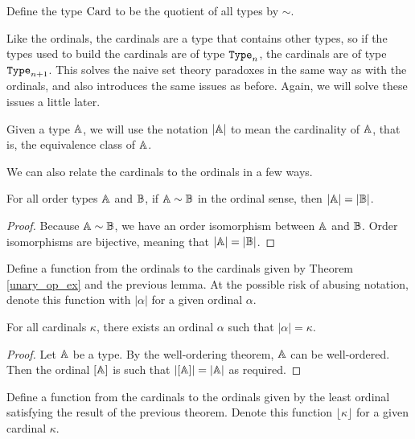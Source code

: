\documentclass[../../math.tex]{subfiles}
\begin{document}
\begin{definition}
    Define the type $\operatorname{Card}$ to be the quotient of all types by $\sim$.
\end{definition}

Like the ordinals, the cardinals are a type that contains other types, so if the
types used to build the cardinals are of type $\Type_n$, the cardinals are of
type $\Type_{n+1}$.  This solves the naive set theory paradoxes in the same way
as with the ordinals, and also introduces the same issues as before.  Again, we
will solve these issues a little later.

\begin{definition}
    Given a type $\mathbb{A}$, we will use the notation $|\mathbb{A}|$ to mean the cardinality
    of $\mathbb{A}$, that is, the equivalence class of $\mathbb{A}$.
\end{definition}

We can also relate the cardinals to the ordinals in a few ways.

\begin{lemma}
    For all order types $\mathbb{A}$ and $\mathbb{B}$, if $\mathbb{A} \sim \mathbb{B}$ in the ordinal sense,
    then $|\mathbb{A}| = |\mathbb{B}|$.
\end{lemma}
\begin{proof}
    Because $\mathbb{A} \sim \mathbb{B}$, we have an order isomorphism between $\mathbb{A}$ and $\mathbb{B}$.
    Order isomorphisms are bijective, meaning that $|\mathbb{A}| = |\mathbb{B}|$.
\end{proof}

\begin{definition}
    Define a function from the ordinals to the cardinals given by Theorem
    \ref{unary_op_ex} and the previous lemma.  At the possible risk of abusing
    notation, denote this function with $|\alpha|$ for a given ordinal $\alpha$.
\end{definition}

\begin{lemma}
    For all cardinals $\kappa$, there exists an ordinal $\alpha$ such that
    $|\alpha| = \kappa$.
\end{lemma}
\begin{proof}
    Let $\mathbb{A}$ be a type.  By the well-ordering theorem, $\mathbb{A}$ can be well-ordered.
    Then the ordinal $[\mathbb{A}]$ is such that $|[\mathbb{A}]| = |\mathbb{A}|$ as required.
\end{proof}

\begin{definition}
    Define a function from the cardinals to the ordinals given by the least
    ordinal satisfying the result of the previous theorem.  Denote this function
    $\lfloor \kappa \rfloor$ for a given cardinal $\kappa$.
\end{definition}
\end{document}
